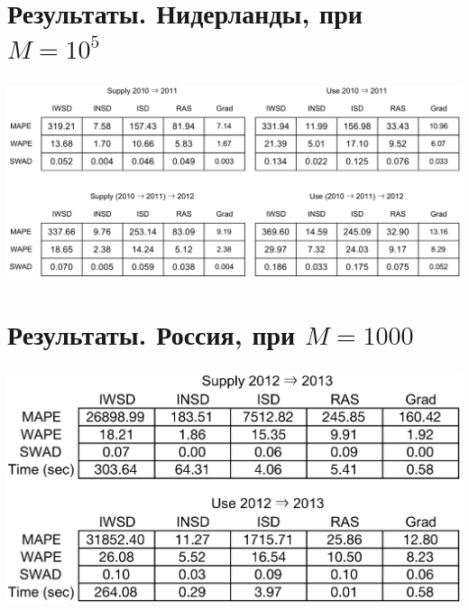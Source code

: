 \documentclass{beamer}
\begin{document}
\section{Результаты. Нидерланды, при $M = 10^5$}
\begin{frame}
	\frametitle{\insertsection}
	
	\includegraphics[width=\textwidth]{2019-12-12_06-04-50.png}
	
\end{frame}

\section{Результаты. Россия, при $M = 1000$}
\begin{frame}
	\frametitle{\insertsection}
	
	\includegraphics[width=\textwidth]{2019-12-12_06-20-46.png}
	
\end{frame}
\end{document}
